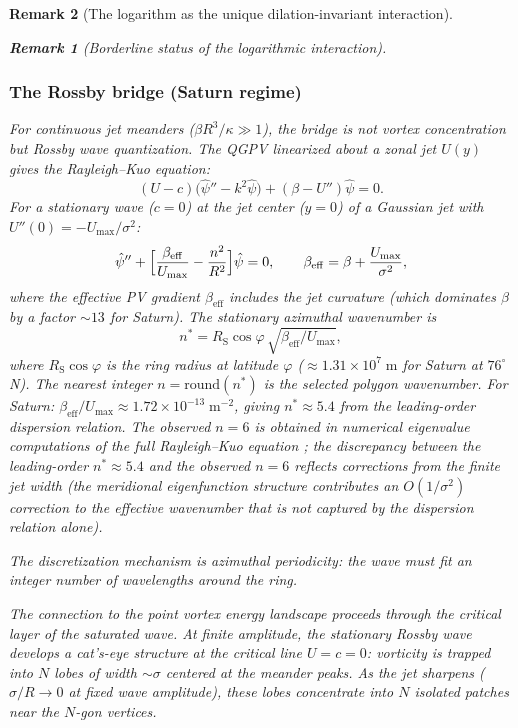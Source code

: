 \documentclass[12pt, a4paper]{article}
\newtheorem{remark}{Remark}[section]
\numberwithin{equation}{section}
\begin{document}
\begin{remark}[The logarithm as the unique dilation-invariant interaction]
\begin{remark}[Borderline status of the logarithmic interaction]
\subsubsection{The Rossby bridge (Saturn regime)}
\label{sec:rossby-bridge}

For continuous jet meanders ($\beta R^3/\kappa \gg 1$), the bridge
is not vortex concentration but \emph{Rossby wave quantization}.
The QGPV linearized about a zonal jet $U(y)$ gives the Rayleigh--Kuo
equation:
\[
  (U - c)\bigl(\hat\psi'' - k^2\hat\psi\bigr)
  + (\beta - U'')\hat\psi = 0.
\]
For a stationary wave ($c = 0$) at the jet center ($y = 0$) of a
Gaussian jet with $U''(0) = -U_{\max}/\sigma^2$:
\[
  \hat\psi'' + \Bigl[\frac{\beta_{\mathrm{eff}}}{U_{\max}}
  - \frac{n^2}{R^2}\Bigr]\hat\psi = 0,
  \qquad
  \beta_{\mathrm{eff}} = \beta + \frac{U_{\max}}{\sigma^2},
\]
where the effective PV gradient $\beta_{\mathrm{eff}}$ includes the
jet curvature (which dominates $\beta$ by a factor $\sim\!13$ for
Saturn).  The stationary azimuthal wavenumber is
\begin{equation}\label{eq:rossby-bridge}
  n^* = R_{\mathrm{S}}\cos\varphi
  \,\sqrt{\beta_{\mathrm{eff}}/U_{\max}},
\end{equation}
where $R_{\mathrm{S}}\cos\varphi$ is the ring radius at latitude
$\varphi$ ($\approx 1.31 \times 10^7\;\mathrm{m}$ for Saturn at
$76^\circ$\,N).  The nearest integer $n = \mathrm{round}(n^*)$ is
the selected polygon wavenumber.  For Saturn:
$\beta_{\mathrm{eff}}/U_{\max} \approx 1.72 \times
10^{-13}\;\mathrm{m}^{-2}$, giving $n^* \approx 5.4$ from the
leading-order dispersion relation.  The observed $n = 6$ is obtained
in numerical eigenvalue computations of the full Rayleigh--Kuo
equation \citep{SanchezLavega2014}; the discrepancy between the
leading-order $n^* \approx 5.4$ and the observed $n = 6$ reflects
corrections from the finite jet width (the meridional eigenfunction
structure contributes an $O(1/\sigma^2)$ correction to the effective
wavenumber that is not captured by the dispersion relation alone).

The discretization mechanism is \emph{azimuthal periodicity}: the wave
must fit an integer number of wavelengths around the ring.

The connection to the point vortex energy landscape proceeds through
the \emph{critical layer} of the saturated wave.  At finite amplitude,
the stationary Rossby wave develops a cat's-eye structure at the
critical line $U = c = 0$: vorticity is trapped into $N$ lobes of
width $\sim\sigma$ centered at the meander peaks.  As the jet sharpens
($\sigma/R \to 0$ at fixed wave amplitude), these lobes concentrate
into $N$ isolated patches near the $N$-gon vertices.


\end{remark}
\end{remark}
\end{document}
